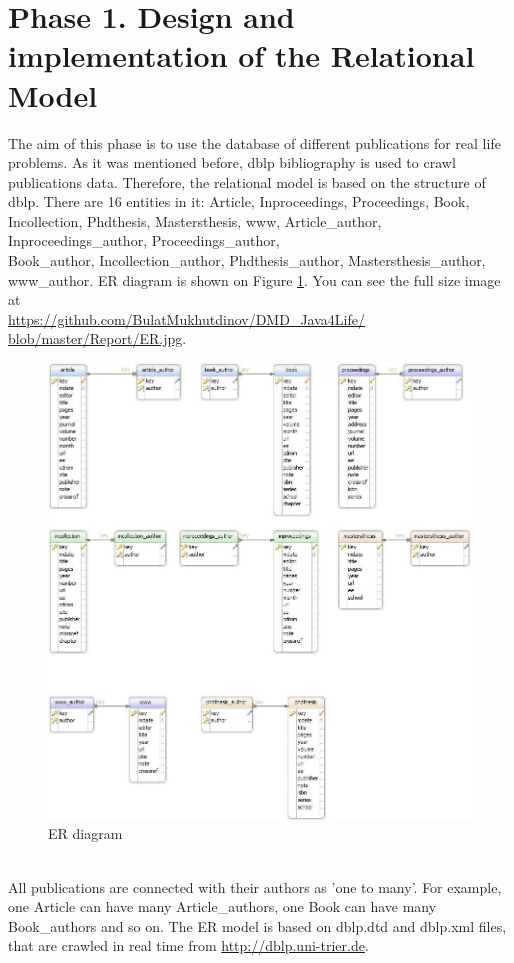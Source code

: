 \documentclass{acm_proc_article-sp}
\begin{document}
\section{Phase 1. Design and implementation of the Relational Model}
The aim of this phase is to use the database of different publications for real life problems. As it was mentioned before, dblp bibliography is used to crawl publications data. Therefore, the relational model is based on the structure of dblp. There are 16 entities in it: Article,  Inproceedings, Proceedings, Book, Incollection, Phdthesis, Mastersthesis, www, Article\_author,  Inproceedings\_author, Proceedings\_author,\\ Book\_author, Incollection\_author, Phdthesis\_author, Mastersthesis\_author, www\_author. ER diagram is shown on Figure \ref{fig:ER}. You can see the full size image at \\ \href{https://github.com/BulatMukhutdinov/DMD_Java4Life/blob/master/Report/ER.jpg}{https://github.com/BulatMukhutdinov/DMD\_Java4Life/\\blob/master/Report/ER.jpg}.
\begin{figure}
	\centering
	\includegraphics[width=0.7\linewidth]{ER}
	\caption{ER diagram}
	\label{fig:ER}
\end{figure}
\\All publications are connected with their authors as 'one to many'. For example, one Article can have many Article\_authors, one Book can have many Book\_authors and so on. The ER model is based on dblp.dtd and dblp.xml files, that are crawled in real time from \href{http://dblp.uni-trier.de}{http://dblp.uni-trier.de}.
\end{document}
